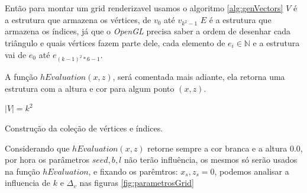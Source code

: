 Então para montar um grid renderizavel usamos o algoritmo \ref{alg:genVectors}
$V$ é a estrutura que armazena os vértices, de $v_{0}$ até $v_{k^2-1}$ 
$E$ é a estrutura que armazena os índices, já que o \textit{OpenGL} precisa
saber a ordem de desenhar cada triângulo e quais vértices fazem parte dele, 
cada elemento de $e_{i} \in \mathbb{N}$ e a estrutura vai de $e_{0}$ até $e_{(k-1)^2 * 6 - 1}$.

A função \textit{$hEvaluation(x, z)$}, será comentada mais adiante, ela retorna uma estrutura
com a altura e cor para algum ponto $(x, z)$.
 
\begin{algorithm}[H]\label{alg:genVectors}
    $|V| = k^2$\;
    
    \caption{Construção da coleção de vértices e índices.}
\end{algorithm}

Considerando que \textit{$hEvaluation(x, z)$} retorne sempre a cor branca
e a altura $0.0$, por hora os parâmetros $seed, b, l$ não terão influência, os mesmos 
só serão usados na função \textit{$hEvaluation$}, e fixando os parêmtros: $x_{s}, z_{s} = 0$, 
podemos analisar a influencia de $k$ e $\Delta_{v}$ nas figuras \ref{fig:parametrosGrid}


